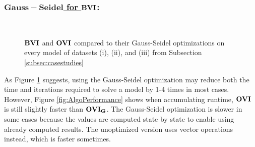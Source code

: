 \subsubsection*{\underline{$\mathbf{Gauss-Seidel}$ for $\mathbf{BVI}$}:}
\begin{figure}[h!]
    \centering
    \
    \caption{$\mathbf{BVI}$ and $\mathbf{OVI}$ compared to their Gauss-Seidel optimizations on every model of datasets (i), (ii), and (iii) from Subsection \ref{subsec:casestudies}}%
    \label{fig:Scatter_G}%
    \end{figure}
\FloatBarrier

As Figure \ref{fig:Scatter_G} suggests, using the Gauss-Seidel optimization may reduce both the time and iterations required to solve a model by 1-4 times in most cases.
However, Figure \ref{fig:AlgoPerformance} shows when accumulating runtime, $\mathbf{OVI}$ is still slightly faster than $\mathbf{OVI_G}$.
The Gauss-Seidel optimization is slower in some cases because the values are computed state by state to enable using already computed results.
The unoptimized version uses vector operations instead, which is faster sometimes.


